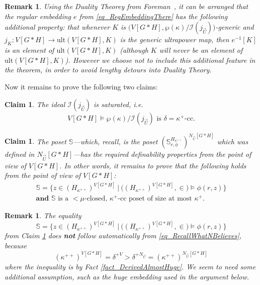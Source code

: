 \documentclass{amsart}
\newtheorem{globalClaim}[theorem]{Claim}
\newtheorem{remark}[theorem]{Remark}
\begin{document}
\begin{remark}
Using the Duality Theorey from Foreman~\cite{MattHandbook}, it can be arranged that the regular embedding $e$ from \eqref{eq_RegEmbeddingThere} has the following additional property:  that whenever $K$ is $\big( V[G*H],\wp(\kappa)/\mathcal{I}(j_{\vec{U}}) \big)$-generic and $j_K: V[G*H] \to \text{ult}(V[G*H],K)$ is the generic ultrapower map, then $e^{-1}[K]$ is an element of $\text{ult}(V[G*H],K)$ (although $K$ will never be an element of $\text{ult}(V[G*H],K)$).   However we choose not to include this additional feature in the theorem, in order to avoid lengthy detours into Duality Theory.
\end{remark}





Now it remains to prove the following two claims:
\begin{globalClaim}\label{clm_Saturated}
The ideal $\mathcal{I}(j_{\vec{U}})$ is saturated, i.e.
\[
V[G*H] \models \wp(\kappa)/\mathcal{I}(j_{\vec{U}}) \text{ is } \delta = \kappa^+ \text{-cc}.
\]  
\end{globalClaim}

\begin{globalClaim}\label{clm_EqualityToProve} 
The poset $\mathbb{S}$---which, recall, is the poset  $(\mathbb{S}^{H_{\kappa^{++}}}_{r,\phi})^{N_{\vec{U}}[G*H]}$ which was defined in $N_{\vec{U}}[G*H]$---has the required definability properties from the point of view of $V[G*H]$.  In other words, it remains to prove that the following holds from the point of view of $V[G*H]$:
\begin{align*}
  \mathbb{S} = \{ z \in (H_{\kappa^{++}})^{V[G*H]} \ | \   \big(  (H_{\kappa^{++}})^{V[G*H]}, \in \big) \models \phi(r,z)   \} \\
\textbf{and } \mathbb{S} \text{ is a } <\mu \text{-closed, } \kappa^+ \text{-cc poset of size at most } \kappa^+.
\end{align*}

\end{globalClaim}


\begin{remark}\label{rem_RegardingHuge}
The equality 
\[
\mathbb{S} = \{ z \in (H_{\kappa^{++}})^{V[G*H]} \ | \   \big(  (H_{\kappa^{++}})^{V[G*H]}, \in \big) \models \phi(r,z)   \}
\]
from Claim \ref{clm_EqualityToProve} does \textbf{not} follow automatically from \eqref{eq_RecallWhatNBelieves}, because 
\[
(\kappa^{++})^{V[G*H]} = \delta^{+V} > \delta^{+N_{\vec{U}}} =  (\kappa^{++})^{N_{\vec{U}}[G*H]}
\]
where the inequality is by Fact \ref{fact_DerivedAlmostHuge}.  We seem to need some additional assumption, such as the huge embedding used in the argument below.
\end{remark}
\end{document}
